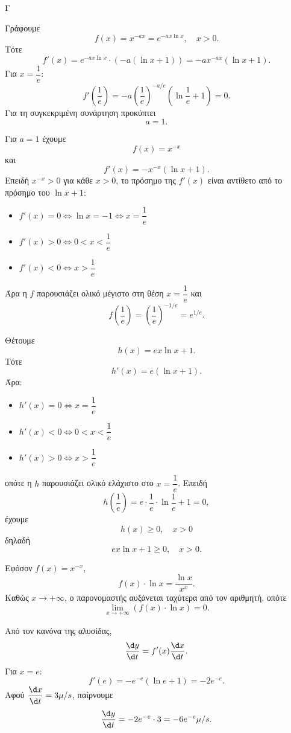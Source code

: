 \begin{thema}{Γ}
\begin{erwthma}
\item Γράφουμε
\[
f(x)=x^{-ax}=e^{-ax\ln x}, \quad x>0.
\]
Τότε
\[
f'(x)=e^{-ax\ln x}\cdot(-a(\ln x+1))=-ax^{-ax}(\ln x+1).
\]
Για $x=\dfrac{1}{e}$:
\[
f'\left(\frac{1}{e}\right)
=
-a\left(\frac{1}{e}\right)^{-a/e}\left(\ln \frac{1}{e}+1\right)=0.
\]
Για τη συγκεκριμένη συνάρτηση προκύπτει
\[
a=1.
\]

\item Για $a=1$ έχουμε
\[
f(x)=x^{-x}
\]
και
\[
f'(x)=-x^{-x}(\ln x+1).
\]
Επειδή $x^{-x}>0$ για κάθε $x>0$, το πρόσημο της $f'(x)$ είναι αντίθετο από το πρόσημο του $\ln x+1$:
\begin{itemize}
\item $f'(x)=0 \Leftrightarrow \ln x=-1 \Leftrightarrow x=\dfrac{1}{e}$
\item $f'(x)>0 \Leftrightarrow 0<x<\dfrac{1}{e}$
\item $f'(x)<0 \Leftrightarrow x>\dfrac{1}{e}$
\end{itemize}
Άρα η $f$ παρουσιάζει ολικό μέγιστο στη θέση $x=\dfrac{1}{e}$ και
\[
f\left(\frac{1}{e}\right)=\left(\frac{1}{e}\right)^{-1/e}=e^{1/e}.
\]

Θέτουμε
\[
h(x)=ex\ln x+1.
\]
Τότε
\[
h'(x)=e(\ln x+1).
\]
Άρα:
\begin{itemize}
\item $h'(x)=0 \Leftrightarrow x=\dfrac{1}{e}$
\item $h'(x)<0 \Leftrightarrow 0<x<\dfrac{1}{e}$
\item $h'(x)>0 \Leftrightarrow x>\dfrac{1}{e}$
\end{itemize}
οπότε η $h$ παρουσιάζει ολικό ελάχιστο στο $x=\dfrac{1}{e}$. Επειδή
\[
h\left(\frac{1}{e}\right)=e\cdot \frac{1}{e}\cdot \ln \frac{1}{e}+1=0,
\]
έχουμε
\[
h(x)\ge 0,\quad x>0
\]
δηλαδή
\[
ex\ln x+1\ge 0,\quad x>0.
\]

\item Εφόσον $f(x)=x^{-x}$,
\[
f(x)\cdot \ln x=\frac{\ln x}{x^x}.
\]
Καθώς $x\to +\infty$, ο παρονομαστής αυξάνεται ταχύτερα από τον αριθμητή, οπότε
\[
\lim_{x\to +\infty}\left(f(x)\cdot \ln x\right)=0.
\]

\item Από τον κανόνα της αλυσίδας,
\[
\frac{\d y}{\d t}=f'(x)\frac{\d x}{\d t}.
\]
Για $x=e$:
\[
f'(e)=-e^{-e}(\ln e+1)=-2e^{-e}.
\]
Αφού $\dfrac{\d x}{\d t}=3\mu/s$, παίρνουμε
\[
\frac{\d y}{\d t}=-2e^{-e}\cdot 3=-6e^{-e}\mu/s.
\]
\end{erwthma}
\end{thema}
